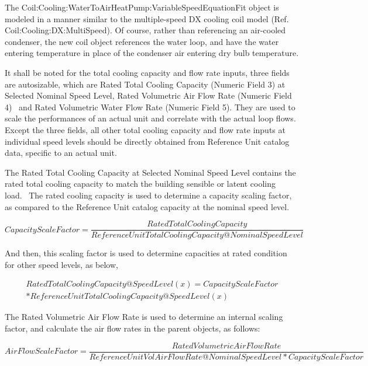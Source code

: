 The Coil:Cooling:WaterToAirHeatPump:VariableSpeedEquationFit object is modeled in a manner similar to the multiple-speed DX cooling coil model (Ref. Coil:Cooling:DX:MultiSpeed). Of course, rather than referencing an air-cooled condenser, the new coil object references the water loop, and have the water entering temperature in place of the condenser air entering dry bulb temperature.

It shall be noted for the total cooling capacity and flow rate inputs, three fields are autosizable, which are Rated Total Cooling Capacity (Numeric Field 3) at Selected Nominal Speed Level, Rated Volumetric Air Flow Rate (Numeric Field 4) ~and Rated Volumetric Water Flow Rate (Numeric Field 5). They are used to scale the performances of an actual unit and correlate with the actual loop flows. Except the three fields, all other total cooling capacity and flow rate inputs at individual speed levels should be directly obtained from Reference Unit catalog data, specific to an actual unit.

The Rated Total Cooling Capacity at Selected Nominal Speed Level contains the rated total cooling capacity to match the building sensible or latent cooling load.~ The rated cooling capacity is used to determine a capacity scaling factor, as compared to the Reference Unit catalog capacity at the nominal speed level.

\begin{equation}
CapacityScaleFactor = \frac{{RatedTotalCoolingCapacity}}{{ReferenceUnitTotalCoolingCapacity@NominalSpeedLevel}}
\end{equation}

And then, this scaling factor is used to determine capacities at rated condition for other speed levels, as below,

\begin{equation}
\begin{split}
  RatedTotalCoolingCapacity@SpeedLevel(x) = CapacityScaleFactor \\
  * ReferenceUnitTotalCoolingCapacity@SpeedLevel(x)
\end{split}
\end{equation}

The Rated Volumetric Air Flow Rate is used to determine an internal scaling factor, and calculate the air flow rates in the parent objects, as follows:

{\scriptsize
\begin{equation}
  AirFlowScaleFactor = \frac{RatedVolumetricAirFlowRate}{ReferenceUnitVolAirFlowRate@NominalSpeedLevel * CapacityScaleFactor}
\end{equation}}

